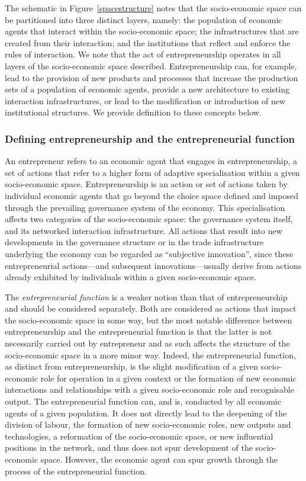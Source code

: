The schematic in Figure~\ref{spacestructure} notes that the socio-economic space can be partitioned into three distinct layers, namely: the population of economic agents that interact within the socio-economic space; the infrastructures that are created from their interaction; and the institutions that reflect and enforce the rules of interaction. We note that the act of entrepreneurship operates in all layers of the socio-economic space described. Entrepreneurship can, for example, lead to the provision of new products and processes that increase the production sets of a population of economic agents, provide a new architecture to existing interaction infrastructures, or lead to the modification or introduction of new institutional structures. We provide definition to these concepts below.

\subsubsection{Defining entrepreneurship and the entrepreneurial function}
\label{definingentrepreneurship}

An entrepreneur refers to an economic agent that engages in entrepreneurship, a set of actions that refer to a higher form of adaptive specialisation within a given socio-economic space.  Entrepreneurship is an action or set of actions taken by individual economic agents that go beyond the choice space defined and imposed through the prevailing governance system of the economy. This specialisation affects two categories of the socio-economic space: the governance system itself, and its networked interaction infrastructure. All actions that result into new developments in the governance structure or in the trade infrastructure underlying the economy can be regarded as ``subjective innovation'', since these entrepreneurial actions---and subsequent innovations---usually derive from actions already exhibited by individuals within a given socio-economic space.

The \emph{entrepreneurial function} is a weaker notion than that of entrepreneurship and should be considered separately. Both are considered as actions that impact the socio-economic space in some way, but the most notable difference between entrepreneurship and the entrepreneurial function is that the latter is not necessarily carried out by entrepreneur and as such affects the structure of the socio-economic space in a more minor way. Indeed, the entrepreneurial function, as distinct from entrepreneurship, is the slight modification of a given socio-economic role for operation in a given context or the formation of new economic interactions and relationships with a given socio-economic role and recognisable output. The entrepreneurial function can, and is, conducted by all economic agents of a given population. It does not directly lead to the deepening of the division of labour, the formation of new socio-economic roles, new outputs and technologies, a reformation of the socio-economic space, or new influential positions in the network, and thus does not spur development of the socio-economic space. However, the economic agent can spur growth through the process of the entrepreneurial function.

